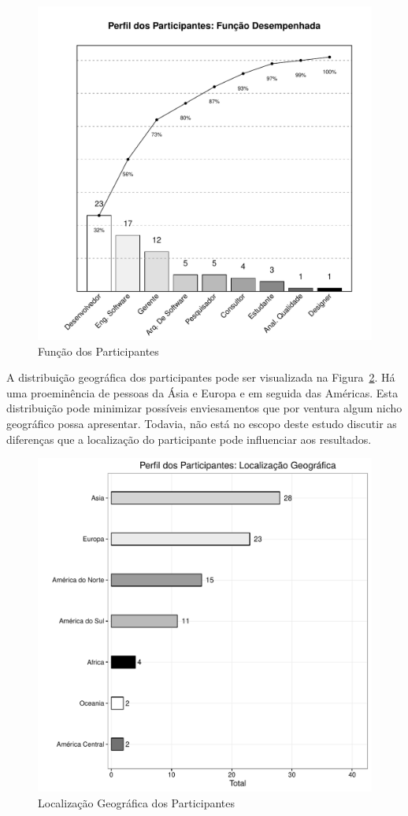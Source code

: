 \begin{figure}[htpb]
	\centering
	\includegraphics[width=0.6\linewidth]{./chapter-pesquisa-com-profissionais/img/grafico_melhoria_fgrm_funcao_participantes.pdf}
	\caption{Função dos Participantes}
\label{fig:grafico_melhorias_fgrm_funcao_particantes}
\end{figure}

A distribuição geográfica dos participantes pode ser visualizada na
Figura~\ref{fig:grafico_melhorias_fgrm_localizacao_geografica}. Há uma
proeminência de pessoas da Ásia e Europa e em seguida das Américas. Esta
distribuição pode minimizar possíveis enviesamentos que por ventura algum nicho
geográfico possa apresentar. Todavia, não está no escopo deste estudo discutir
as diferenças que a localização do participante pode influenciar aos resultados.

\begin{figure}[htpb]
	\centering
	\includegraphics[width=0.8\linewidth]{./chapter-pesquisa-com-profissionais/img/grafico_melhorias_fgrm_localizacao_geografica.pdf}
	\caption{Localização Geográfica dos Participantes}
\label{fig:grafico_melhorias_fgrm_localizacao_geografica}
\end{figure}

